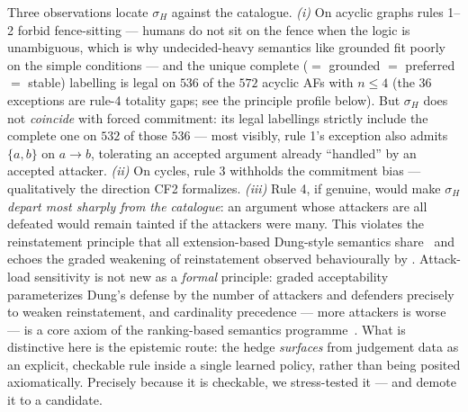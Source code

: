 \documentclass[review,12pt]{elsarticle}
\theoremstyle{definition}
\theoremstyle{remark}
\begin{document}
Three observations locate $\sigma_H$ against the catalogue. \emph{(i)} On
acyclic graphs rules 1--2 forbid fence-sitting --- humans do not sit on the
fence when the logic is unambiguous, which is why undecided-heavy semantics
like grounded fit poorly on the simple conditions --- and the unique complete
($=$ grounded $=$ preferred $=$ stable) labelling is legal on $536$ of the
$572$ acyclic AFs with $n\le4$ (the $36$ exceptions are rule-4 totality gaps;
see the principle profile below). But $\sigma_H$ does not \emph{coincide}
with forced commitment: its legal labellings strictly include the complete
one on $532$ of those $536$ --- most visibly, rule 1's exception also admits
$\{a,b\}$ on $a\!\to\!b$, tolerating an accepted argument already ``handled''
by an accepted attacker.
\emph{(ii)} On cycles, rule 3 withholds the commitment bias --- qualitatively
the direction CF2 formalizes. \emph{(iii)} Rule 4, if genuine, would make
$\sigma_H$ \emph{depart most sharply from the catalogue}: an argument whose
attackers are all defeated would remain tainted if the attackers were many. This
violates the reinstatement principle that all extension-based Dung-style
semantics share~\citep{dung1995,baroni2011} and echoes the graded weakening of
reinstatement observed behaviourally by \citet{rahwan2010}. Attack-load
sensitivity is not new as a \emph{formal} principle: graded
acceptability~\citep{grossi2019graded} parameterizes Dung's defense by the
number of attackers and defenders precisely to weaken reinstatement, and
cardinality precedence --- more attackers is worse --- is a core axiom of the
ranking-based semantics programme~\citep{amgoud2013ranking,bonzon2016ranking}.
What is distinctive here is the epistemic route: the hedge \emph{surfaces}
from judgement data as an explicit, checkable rule inside a single learned
policy, rather than being posited axiomatically. Precisely because it is
checkable, we stress-tested it --- and demote it to a candidate.
\end{document}
